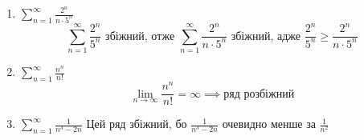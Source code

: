 \documentclass[../rgr_2.tex]{subfiles}
\begin{document}
\Solution

\begin{enumerate}
	\item $\sum_{n=1}^\infty \frac{2^n}{n\cdot5^n}$
	\begin{equation}
		\sum_{n=1}^\infty\frac{2^n}{5^n}
		\text{~збіжний, отже~}
		\sum_{n=1}^\infty\frac{2^n}{n\cdot5^n}
		\text{~збіжний, адже~}
		\frac{2^n}{5^n} \geq
		\frac{2^n}{n\cdot5^n}
	\end{equation}

	\item $\sum_{n=1}^\infty \frac{n^n}{n!}$
	\begin{equation}
		\lim_{n\to\infty}\frac{n^n}{n!}=\infty
		\implies\text{ряд розбіжний}
	\end{equation}

	\item $\sum_{n=1}^\infty \frac{1}{n^3-2n}$
	Цей ряд збіжний, бо $\frac{1}{n^3-2n}$ очевидно
		менше за $\frac{1}{n^2}$
\end{enumerate}

\end{document}

